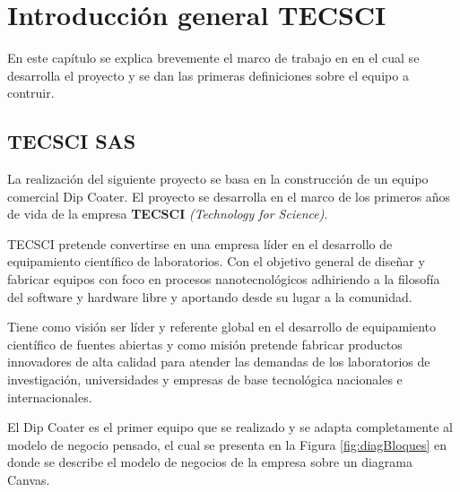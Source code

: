 
\chapter{Introducción general TECSCI} %

\label{Chapter6} %


En este capítulo se explica brevemente el marco de trabajo en en el cual se desarrolla el proyecto y se dan las primeras definiciones sobre el equipo a contruir. 
\section{TECSCI SAS}

La realización del siguiente proyecto se basa en la construcción de un equipo comercial Dip Coater. El proyecto se desarrolla en el marco de los primeros años de vida de la empresa \textbf{TECSCI} \textit{(Technology for Science)}.

TECSCI pretende convertirse en una empresa líder en el desarrollo de equipamiento científico de laboratorios. Con el objetivo general de diseñar y fabricar equipos con foco en procesos nanotecnológicos adhiriendo a la filosofía del software y hardware libre y aportando desde su lugar a la comunidad.

Tiene como visión ser líder y referente global en el desarrollo de equipamiento científico de fuentes abiertas y como misión 
pretende fabricar productos innovadores de alta calidad para atender las demandas de los laboratorios de investigación, universidades y empresas de base tecnológica nacionales e internacionales.

El Dip Coater es el primer equipo que se realizado y se adapta completamente al modelo de negocio pensado, el cual se presenta en la Figura \ref{fig:diagBloques} en donde se describe el modelo de negocios de la empresa sobre un diagrama Canvas.

\clearpage

